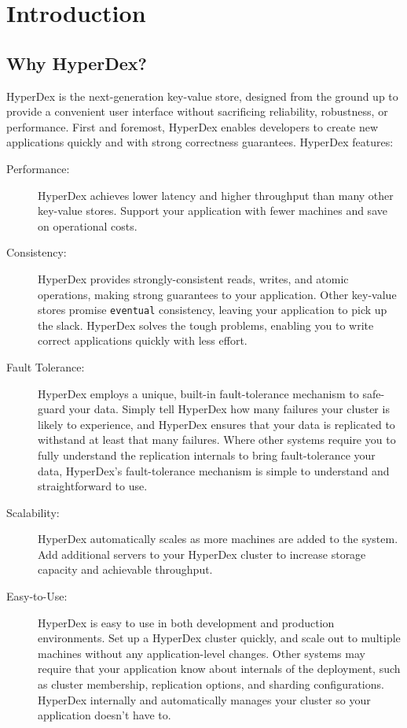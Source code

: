 \chapter{Introduction}
\label{chap:introduction}

\section{Why HyperDex?}
\label{sec:introduction:why}

HyperDex is the next-generation key-value store, designed from the ground up to
provide a convenient user interface without sacrificing reliability, robustness,
or performance.  First and foremost, HyperDex enables developers to create new
applications quickly and with strong correctness guarantees.
HyperDex features:

\begin{description}
\item[Performance:]  HyperDex achieves lower latency and higher throughput than
many other key-value stores.  Support your application with fewer machines and
save on operational costs.

\item[Consistency:]  HyperDex provides strongly-consistent reads, writes, and
atomic operations, making strong guarantees to your application.  Other
key-value stores promise \texttt{eventual} consistency, leaving your application
to pick up the slack.  HyperDex solves the tough problems, enabling you to write
correct applications quickly with less effort.

\item[Fault Tolerance:]  HyperDex employs a unique, built-in fault-tolerance
mechanism to safe-guard your data.  Simply tell HyperDex how many failures your
cluster is likely to experience, and HyperDex ensures that your data is
replicated to withstand at least that many failures.  Where other systems
require you to fully understand the replication internals to bring
fault-tolerance your data, HyperDex's fault-tolerance mechanism is simple to
understand and straightforward to use.

\item[Scalability:]  HyperDex automatically scales as more machines are added to
the system.  Add additional servers to your HyperDex cluster to increase storage
capacity and achievable throughput.

\item[Easy-to-Use:]  HyperDex is easy to use in both development and production
environments.  Set up a HyperDex cluster quickly, and scale out to multiple
machines without any application-level changes.  Other systems may require that
your application know about internals of the deployment, such as cluster
membership, replication options, and sharding configurations.  HyperDex
internally and automatically manages your cluster so your application doesn't
have to.
\end{description}

